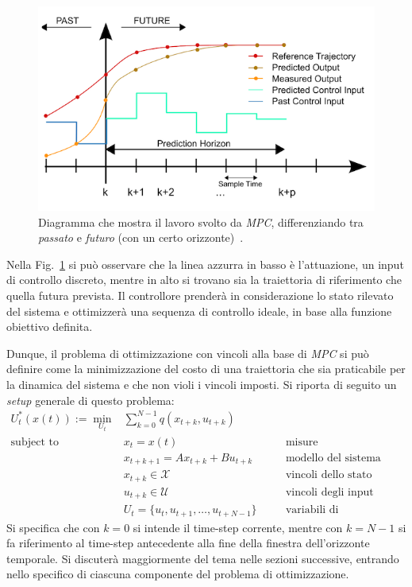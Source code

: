 \begin{figure}[H]
    \centering
    \includegraphics[scale=0.7]{images/mpc_prediction.png}
    \caption{Diagramma che mostra il lavoro 
    svolto da \textit{MPC}, differenziando tra 
    \textit{passato} e \textit{futuro} (con un certo orizzonte)~\cite{mpschema}.}
    \label{fig:fig8} %
\end{figure}

Nella Fig.~\ref{fig:fig8} si può osservare
che la linea azzurra in basso è l'attuazione, 
un input di controllo discreto, mentre in alto 
si trovano sia la traiettoria di riferimento 
che quella futura prevista.
Il controllore prenderà in considerazione lo stato rilevato del sistema e 
ottimizzerà una sequenza di controllo ideale, 
in base alla funzione obiettivo definita.

Dunque, il problema di ottimizzazione con vincoli alla base di \textit{MPC} si può 
definire come la minimizzazione del costo di una traiettoria che sia praticabile per la
dinamica del sistema e che non violi i vincoli imposti. Si riporta di seguito un \textit{setup} 
generale di questo problema:
\[
\begin{aligned}
U_t^*(x(t)) := \min_{U_t} &\sum_{k=0}^{N-1} q(x_{t+k}, u_{t+k}) \\
\text{subject to } & x_t = x(t) & \quad & \text{misure} \\
& x_{t+k+1} = Ax_{t+k} + Bu_{t+k} & \quad & \text{modello del sistema} \\
& x_{t+k} \in \mathcal{X} & \quad & \text{vincoli dello stato} \\
& u_{t+k} \in \mathcal{U} & \quad & \text{vincoli degli input} \\
& U_t = \{u_t, u_{t+1}, \ldots, u_{t+N-1}\} & \quad & \text{variabili di ottimizzazione}
\end{aligned}
\]
Si specifica che con $k = 0$ si intende il time-step corrente, mentre con $k = N-1$ si fa 
riferimento al time-step antecedente alla fine della finestra dell'orizzonte temporale. 
Si discuterà maggiormente del tema nelle sezioni successive, entrando nello specifico di ciascuna 
componente del problema di ottimizzazione.

